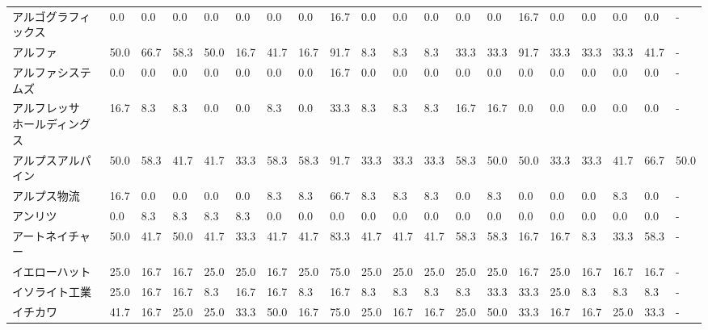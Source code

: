 \begin{tabular}{llllllllllllllllllll}
アルゴグラフィックス      &    0.0 &    0.0 &       0.0 &       0.0 &        0.0 &    0.0 &    0.0 &   16.7 &     0.0 &     0.0 &    0.0 &   0.0 &    0.0 &    16.7 &     0.0 &   0.0 &   0.0 &   0.0 &     - \\
アルファ            &   50.0 &   66.7 &      58.3 &      50.0 &       16.7 &   41.7 &   16.7 &   91.7 &     8.3 &     8.3 &    8.3 &  33.3 &   33.3 &    91.7 &    33.3 &  33.3 &  33.3 &  41.7 &     - \\
アルファシステムズ       &    0.0 &    0.0 &       0.0 &       0.0 &        0.0 &    0.0 &    0.0 &   16.7 &     0.0 &     0.0 &    0.0 &   0.0 &    0.0 &     0.0 &     0.0 &   0.0 &   0.0 &   0.0 &     - \\
アルフレッサ　ホールディングス &   16.7 &    8.3 &       8.3 &       0.0 &        0.0 &    8.3 &    0.0 &   33.3 &     8.3 &     8.3 &    8.3 &  16.7 &   16.7 &     0.0 &     0.0 &   0.0 &   0.0 &   0.0 &     - \\
アルプスアルパイン       &   50.0 &   58.3 &      41.7 &      41.7 &       33.3 &   58.3 &   58.3 &   91.7 &    33.3 &    33.3 &   33.3 &  58.3 &   50.0 &    50.0 &    33.3 &  33.3 &  41.7 &  66.7 &  50.0 \\
アルプス物流          &   16.7 &    0.0 &       0.0 &       0.0 &        0.0 &    8.3 &    8.3 &   66.7 &     8.3 &     8.3 &    8.3 &   0.0 &    8.3 &     0.0 &     0.0 &   0.0 &   8.3 &   0.0 &     - \\
アンリツ            &    0.0 &    8.3 &       8.3 &       8.3 &        8.3 &    0.0 &    0.0 &    0.0 &     0.0 &     0.0 &    0.0 &   0.0 &    0.0 &     0.0 &     0.0 &   0.0 &   0.0 &   0.0 &     - \\
アートネイチャー        &   50.0 &   41.7 &      50.0 &      41.7 &       33.3 &   41.7 &   41.7 &   83.3 &    41.7 &    41.7 &   41.7 &  58.3 &   58.3 &    16.7 &    16.7 &   8.3 &  33.3 &  58.3 &     - \\
イエローハット         &   25.0 &   16.7 &      16.7 &      25.0 &       25.0 &   16.7 &   25.0 &   75.0 &    25.0 &    25.0 &   25.0 &  25.0 &   25.0 &    16.7 &    25.0 &  16.7 &  16.7 &  16.7 &     - \\
イソライト工業         &   25.0 &   16.7 &      16.7 &       8.3 &       16.7 &   16.7 &    8.3 &   16.7 &     8.3 &     8.3 &    8.3 &   8.3 &   33.3 &    33.3 &    25.0 &   8.3 &   8.3 &   8.3 &     - \\
イチカワ            &   41.7 &   16.7 &      25.0 &      25.0 &       33.3 &   50.0 &   16.7 &   75.0 &    25.0 &    16.7 &   16.7 &  25.0 &   50.0 &    33.3 &    16.7 &  16.7 &  25.0 &  33.3 &     - \\

\end{tabular}
